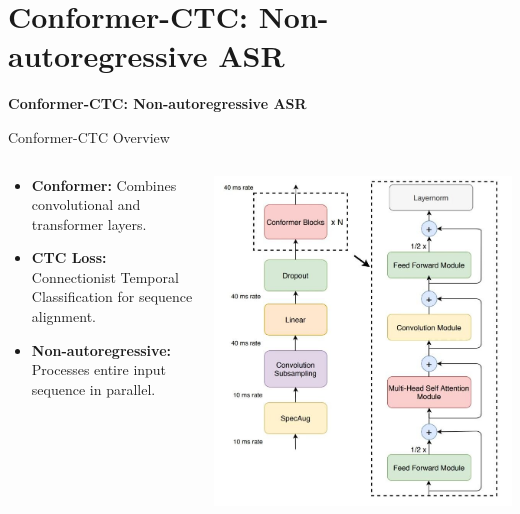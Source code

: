 \section{Conformer-CTC: Non-autoregressive ASR}

\begin{frame}{}
    \LARGE \textbf{Conformer-CTC: Non-autoregressive ASR}
\end{frame}

\begin{frame}{Conformer-CTC Overview}
    \begin{columns}
        \begin{column}{0.6\textwidth}
            \begin{itemize}
                \setlength{\itemsep}{1.5em}
                \item \textbf{Conformer:} Combines convolutional and transformer layers.
                \item \textbf{CTC Loss:} Connectionist Temporal Classification for sequence alignment.
                \item \textbf{Non-autoregressive:} Processes entire input sequence in parallel.
            \end{itemize}
        \end{column}
        \begin{column}{0.5\textwidth}
            \begin{center}
                \includegraphics[width=\textwidth,height=0.9\textheight,keepaspectratio]{images/audio-nlp/conformer-ctc.png}
            \end{center}
        \end{column}
    \end{columns}
\end{frame}

